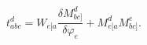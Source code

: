 \begin{equation}
t_{abc}^{d}=W_{e[a}\frac{\delta M_{bc]}^{d}}{\delta \varphi _{e}}%
+M_{e[a}^{d}M_{bc]}^{e}.  \label{c22}
\end{equation}

